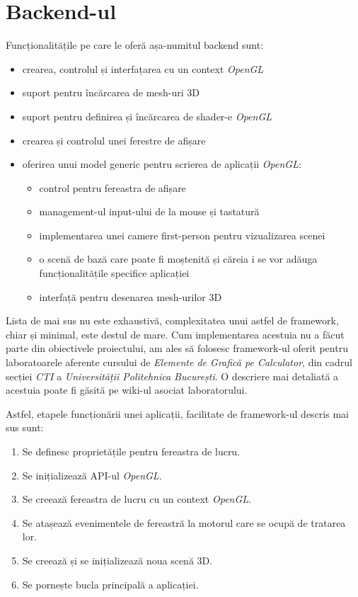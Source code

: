 \documentclass[12pt,a4paper]{report}
\begin{document}
\section{Backend-ul}

Funcționalitățile pe care le oferă așa-numitul backend sunt:
\begin{itemize}
	\item crearea, controlul și interfațarea cu un context \textit{OpenGL}
	\item suport pentru încărcarea de mesh-uri 3D
	\item suport pentru definirea și încărcarea de shader-e \textit{OpenGL}
	\item crearea și controlul unei ferestre de afișare
	\item oferirea unui model generic pentru scrierea de aplicații \textit{OpenGL}:
		\begin{itemize}
			\item control pentru fereastra de afișare
			\item management-ul input-ului de la mouse și tastatură
			\item implementarea unei camere first-person pentru vizualizarea scenei
			\item o scenă de bază care poate fi moștenită și căreia i se vor adăuga funcționalitățile specifice aplicației
			\item interfață pentru desenarea mesh-urilor 3D
		\end{itemize}
\end{itemize}
Lista de mai sus nu este exhaustivă, complexitatea unui astfel de framework, chiar și minimal, este destul de mare. Cum implementarea acestuia nu a făcut parte din obiectivele proiectului, am ales să folosesc framework-ul\cite{framework_egc_github} oferit pentru laboratoarele aferente cursului de \textit{Elemente de Grafică pe Calculator}, din cadrul secției \textit{CTI} a \textit{Universității Politehnica București}. O descriere mai detaliată a acestuia poate fi găsită pe wiki-ul asociat laboratorului\cite{framework_egc_ocw}.

Astfel, etapele funcționării unei aplicații, facilitate de framework-ul descris mai sus sunt:
\begin{enumerate}
	\item Se definesc proprietățile pentru fereastra de lucru.
	\item Se inițializează API-ul \textit{OpenGL}.
	\item Se creează fereastra de lucru cu un context \textit{OpenGL}.
	\item Se atașează evenimentele de fereastră la motorul care se ocupă de tratarea lor.
	\item Se creează și se inițializează noua scenă 3D.
	\item Se pornește bucla principală a aplicației.
\end{enumerate}
\end{document}
